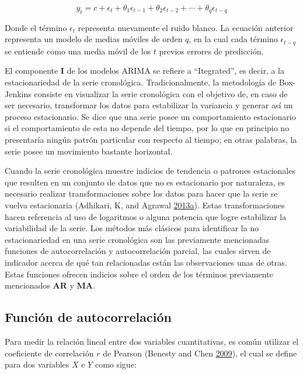 \documentclass[]{article}
\begin{document}
\begin{equation}
y_t=c+\epsilon_t+\theta_1\epsilon_{t-1}+\theta_2\epsilon_{t-2}+\cdots+\theta_q\epsilon_{t-q}
\end{equation}

Donde el término \(\epsilon_t\) representa nuevamente el ruido blanco.
La ecuación anterior representa un modelo de medias móviles de orden
\(q\), en la cual cada término \(\epsilon_{t-q}\) se entiende como una
media móvil de los \(t\) previos errores de predicción.

El componente \textbf{I} de los modelos ARIMA se refiere a
``Itegrated'', es decir, a la estacionariedad de la serie cronológica.
Tradicionalmente, la metodología de Box-Jenkins consiste en visualizar
la serie cronológica con el objetivo de, en caso de ser necesario,
transformar los datos para estabilizar la variancia y generar así un
proceso estacionario. Se dice que una serie posee un comportamiento
estacionario si el comportamiento de esta no depende del tiempo, por lo
que en principio no presentaría ningún patrón particular con respecto al
tiempo; en otras palabras, la serie posee un movimiento bastante
horizontal.

Cuando la serie cronológica muestre indicios de tendencia o patrones
estacionales que resulten en un conjunto de datos que no es estacionario
por naturaleza, es necesario realizar transformaciones sobre los datos
para hacer que la serie se vuelva estacionaria (Adhikari, K, and Agrawal
\protect\hyperlink{ref-diferenciacion}{2013}\protect\hyperlink{ref-diferenciacion}{a}).
Estas transformaciones hacen referencia al uso de logaritmos o alguna
potencia que logre estabilizar la variabilidad de la serie. Los métodos
más clásicos para identificar la no estacionariedad en una serie
cronológica son las previamente mencionadas funciones de autocorrelación
y autocorrelación parcial, las cuales sirven de indicador acerca de qué
tan relacionadas están las observaciones unas de otras. Estas funciones
ofrecen indicios sobre el orden de los términos previamente mencionados
\textbf{AR} y \textbf{MA}.

\subsection{Función de autocorrelación}

Para medir la relación lineal entre dos variables cuantitativas, es
común utilizar el coeficiente de correlación \(r\) de Pearson (Benesty
and Chen \protect\hyperlink{ref-pearson}{2009}), el cual se define para
dos variables \(X\) e \(Y\) como sigue:
\end{document}
